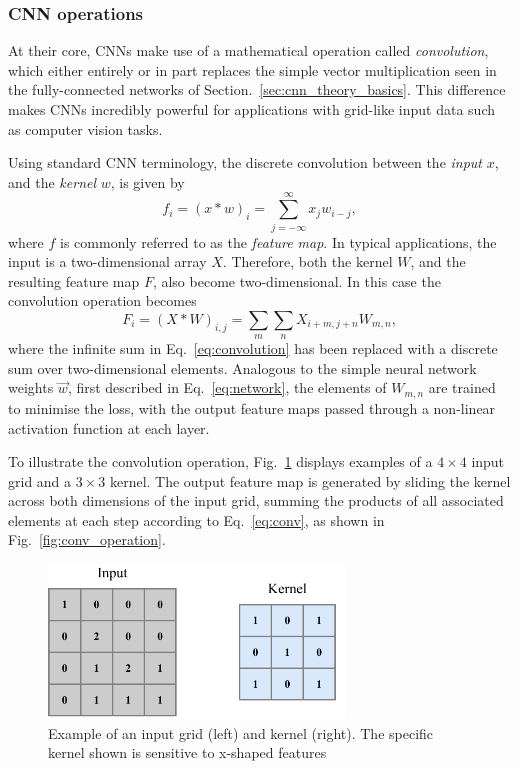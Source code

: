\subsubsection*{CNN operations}

At their core, CNNs make use of a mathematical operation called \emph{convolution}, which either
entirely or in part replaces the simple vector multiplication seen in the fully-connected networks
of Section.~\ref{sec:cnn_theory_basics}. This difference makes CNNs incredibly powerful for
applications with grid-like input data such as computer vision tasks.

Using standard CNN terminology, the discrete convolution between the \emph{input} $x$, and the
\emph{kernel} $w$, is given by
\begin{equation}
    f_{i}=(x*w)_{i}=\sum^{\infty}_{j=-\infty}x_{j}w_{i-j},
    \label{eq:convolution}
\end{equation}
where $f$ is commonly referred to as the \emph{feature map}. In typical applications, the input is
a two-dimensional array $X$. Therefore, both the kernel $W$, and the resulting feature map $F$,
also become two-dimensional. In this case the convolution operation becomes
\begin{equation}
    F_{i}=(X*W)_{i,j}=\sum_{m}\sum_{n}X_{i+m,j+n}W_{m,n},
    \label{eq:conv}
\end{equation}
where the infinite sum in Eq.~\ref{eq:convolution} has been replaced with a discrete sum over
two-dimensional elements. Analogous to the simple neural network weights $\vec{w}$, first
described in Eq.~\ref{eq:network}, the elements of $W_{m,n}$ are trained to minimise the loss,
with the output feature maps passed through a non-linear activation function at each layer.

To illustrate the convolution operation, Fig.~\ref{fig:conv_input} displays examples of a $4
\times 4$ input grid and a $3 \times 3$ kernel. The output feature map is generated by sliding the
kernel across both dimensions of the input grid, summing the products of all associated elements
at each step according to Eq.~\ref{eq:conv}, as shown in Fig.~\ref{fig:conv_operation}.

\begin{figure} %
    \includegraphics[width=0.7\textwidth]{diagrams/6-cnn/conv_input.pdf}
    \caption[Example of a Convolutional Neural Network input grid and kernel]
    {Example of an input grid (left) and kernel (right). The specific kernel shown is sensitive to
        x-shaped features}
    \label{fig:conv_input}
\end{figure}

